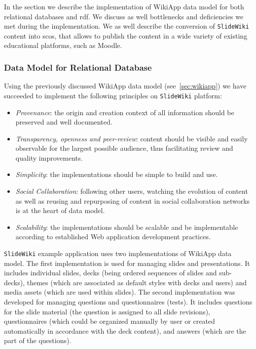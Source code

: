 \documentclass[PhD, Submit, ngerman,UKenglish,table]{scrbook}
\begin{document}
In the section we describe the implementation of WikiApp data model for both relational databases and \gls{rdf}. 
We discuss as well bottlenecks and deficiencies we met during the implementation.
We as well describe the conversion of \texttt{SlideWiki} content into \gls{sco}s, that allows to publish the content in a wide variety of existing educational platforms, such as Moodle.

\subsubsection{Data Model for Relational Database}
\label{subsec:datamodel_rdb}

Using the previously discussed WikiApp data model (see~\autoref{sec:wikiapp}) we have succeeded to implement the following principles on \texttt{SlideWiki} platform:
\begin{itemize}
\item \emph{Provenance}: the origin and creation context of all information should be preserved and well documented.
\item \emph{Transparency, openness and peer-review}: content should be visible and easily observable for the largest possible audience, thus facilitating review and quality improvements.
\item \emph{Simplicity}: the implementations should be simple to build and use.
\item \emph{Social Collaboration}: following other users, watching the evolution of content as well as reusing and repurposing of content in social collaboration networks is at the heart of data model.
\item \emph{Scalability}: the implementations should be scalable and be implementable according to established Web application development practices.
\end{itemize}

\texttt{SlideWiki} example application uses two implementations of WikiApp data model. 
The first implementation is used for managing slides and presentations. 
It includes individual slides, decks (being ordered sequences of slides and sub-decks), themes (which are associated as default styles with decks and users) and media assets (which are used within slides). 
The second implementation was developed for managing questions and questionnaires (tests).
It includes questions for the slide material (the question is assigned to all slide revisions), questionnaires (which could be organized manually by user or created automatically in accordance with the deck content), and answers (which are the part of the questions).
\end{document}
